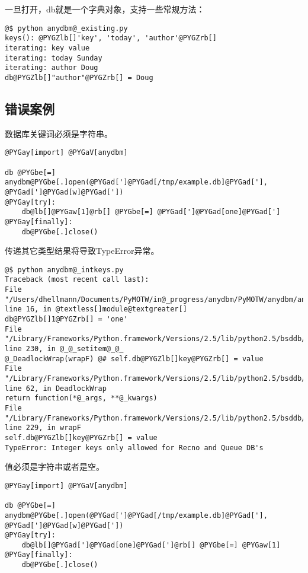\documentclass[a4paper,10pt,english]{manual}
\begin{document}
一旦打开，db就是一个字典对象，支持一些常规方法：

\begin{Verbatim}[commandchars=@\[\]]
@$ python anydbm@_existing.py
keys(): @PYGZlb[]'key', 'today', 'author'@PYGZrb[]
iterating: key value
iterating: today Sunday
iterating: author Doug
db@PYGZlb[]"author"@PYGZrb[] = Doug
\end{Verbatim}


\subsection{错误案例}

数据库关键词必须是字符串。

\begin{Verbatim}[commandchars=@\[\]]
@PYGay[import] @PYGaV[anydbm]

db @PYGbe[=] anydbm@PYGbe[.]open(@PYGad[']@PYGad[/tmp/example.db]@PYGad['], @PYGad[']@PYGad[w]@PYGad['])
@PYGay[try]:
    db@lb[]@PYGaw[1]@rb[] @PYGbe[=] @PYGad[']@PYGad[one]@PYGad[']
@PYGay[finally]:
    db@PYGbe[.]close()
\end{Verbatim}

传递其它类型结果将导致TypeError异常。

\begin{Verbatim}[commandchars=@\[\]]
@$ python anydbm@_intkeys.py
Traceback (most recent call last):
File "/Users/dhellmann/Documents/PyMOTW/in@_progress/anydbm/PyMOTW/anydbm/anydbm@_intkeys.py", line 16, in @textless[]module@textgreater[]
db@PYGZlb[]1@PYGZrb[] = 'one'
File "/Library/Frameworks/Python.framework/Versions/2.5/lib/python2.5/bsddb/@_@_init@_@_.py", line 230, in @_@_setitem@_@_
@_DeadlockWrap(wrapF) @# self.db@PYGZlb[]key@PYGZrb[] = value
File "/Library/Frameworks/Python.framework/Versions/2.5/lib/python2.5/bsddb/dbutils.py", line 62, in DeadlockWrap
return function(*@_args, **@_kwargs)
File "/Library/Frameworks/Python.framework/Versions/2.5/lib/python2.5/bsddb/@_@_init@_@_.py", line 229, in wrapF
self.db@PYGZlb[]key@PYGZrb[] = value
TypeError: Integer keys only allowed for Recno and Queue DB's
\end{Verbatim}

值必须是字符串或者是空。

\begin{Verbatim}[commandchars=@\[\]]
@PYGay[import] @PYGaV[anydbm]

db @PYGbe[=] anydbm@PYGbe[.]open(@PYGad[']@PYGad[/tmp/example.db]@PYGad['], @PYGad[']@PYGad[w]@PYGad['])
@PYGay[try]:
    db@lb[]@PYGad[']@PYGad[one]@PYGad[']@rb[] @PYGbe[=] @PYGaw[1]
@PYGay[finally]:
    db@PYGbe[.]close()
\end{Verbatim}
\end{document}
